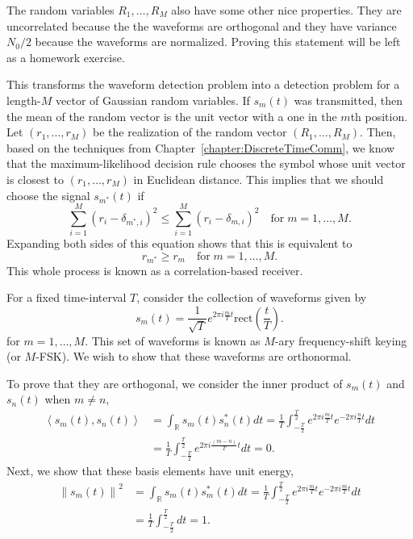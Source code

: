 The random variables $R_1, \ldots , R_M$ also have some other nice properties.
They are uncorrelated because the the waveforms are orthogonal and they have variance $N_0  / 2$ because the waveforms are normalized.
Proving this statement will be left as a homework exercise.

This transforms the waveform detection problem into a detection problem for a length-$M$ vector of Gaussian random variables.
If $s_m (t)$ was transmitted, then the mean of the random vector is the unit vector with a one in the $m$th position.
Let $(r_1, \ldots, r_M)$ be the realization of the random vector $(R_1,\ldots,R_M)$.
Then, based on the techniques from Chapter~\ref{chapter:DiscreteTimeComm}, we know that the maximum-likelihood decision rule chooses the symbol whose unit vector is closest to $(r_1,\ldots,r_M)$ in Euclidean distance.
This implies that we should choose the signal $s_{m^*}(t)$ if
\[ \sum_{i=1}^M (r_i - \delta_{m^*,i})^2 \leq \sum_{i=1}^M (r_i - \delta_{m,i})^2 \quad \mathrm{for}\; m=1,\ldots,M. \]
Expanding both sides of this equation shows that this is equivalent to
\[ r_{m^*} \geq r_m \quad \mathrm{for}\; m=1,\ldots,M. \]
This whole process is known as a correlation-based receiver.


\begin{example} \label{example:TSpacedTruncatedSinusoids}
For a fixed time-interval $T$, consider the collection of waveforms given by
\begin{equation*}
s_m(t) = \frac{1}{\sqrt{T}} e^{2 \pi i \frac{m}{T} t} \mathrm{rect} \left( \frac{t}{T} \right) .
\end{equation*}
for $m = 1, \ldots, M$.
This set of waveforms is known as $M$-ary frequency-shift keying (or $M$-FSK).
We wish to show that these waveforms are orthonormal.

To prove that they are orthogonal, we consider the inner product of $s_m(t)$ and $s_n(t)$ when $m \neq n$,
\begin{equation*}
\begin{split}
\left\langle s_m (t), s_n (t) \right\rangle
&= \int_{\mathbb{R}} s_m (t) s_n^* (t) dt 
= \frac{1}{T} \int_{-\frac{T}{2}}^{\frac{T}{2}}
e^{2 \pi i \frac{m}{T} t} e^{- 2 \pi i \frac{n}{T} t} dt \\
&= \frac{1}{T} \int_{-\frac{T}{2}}^{\frac{T}{2}}
e^{2 \pi i \frac{(m-n)}{T} t} dt
= 0 .
\end{split}
\end{equation*}
Next, we show that these basis elements have unit energy,
\begin{equation*}
\begin{split}
\left\| s_m(t) \right\|^2
&= \int_{\mathbb{R}} s_m (t) s_m^* (t) dt 
= \frac{1}{T} \int_{-\frac{T}{2}}^{\frac{T}{2}}
e^{2 \pi i \frac{m}{T} t} e^{- 2 \pi i \frac{m}{T} t} dt \\
&= \frac{1}{T} \int_{-\frac{T}{2}}^{\frac{T}{2}} dt
= 1 .
\end{split}
\end{equation*}
\end{example}

